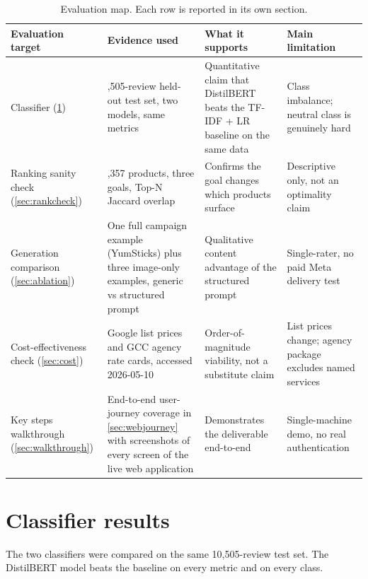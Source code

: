\documentclass[12pt,a4paper]{report}
\begin{document}
\begin{table}[ht!]
  \centering
  \caption{Evaluation map. Each row is reported in its own section.}
  \label{tab:evalmap}
  \small
  \begin{tabular}{@{}>{\raggedright\arraybackslash}p{1.35in}>{\raggedright\arraybackslash}p{1.65in}>{\raggedright\arraybackslash}p{1.55in}>{\raggedright\arraybackslash}p{1.55in}@{}}
    \toprule
    Evaluation target & Evidence used & What it supports & Main limitation \\
    \midrule
    Classifier (\cref{sec:classresults}) & 10,505-review held-out test set, two models, same metrics & Quantitative claim that DistilBERT beats the TF-IDF + LR baseline on the same data & Class imbalance; neutral class is genuinely hard \\
    \addlinespace
    Ranking sanity check (\cref{sec:rankcheck}) & 1,357 products, three goals, Top-N Jaccard overlap & Confirms the goal changes which products surface & Descriptive only, not an optimality claim \\
    \addlinespace
    Generation comparison (\cref{sec:ablation}) & One full campaign example (YumSticks) plus three image-only examples, generic vs structured prompt & Qualitative content advantage of the structured prompt & Single-rater, no paid Meta delivery test \\
    \addlinespace
    Cost-effectiveness check (\cref{sec:cost}) & Google list prices and GCC agency rate cards, accessed 2026-05-10 & Order-of-magnitude viability, not a substitute claim & List prices change; agency package excludes named services \\
    \addlinespace
    Key steps walkthrough (\cref{sec:walkthrough}) & End-to-end user-journey coverage in \cref{sec:webjourney} with screenshots of every screen of the live web application & Demonstrates the deliverable end-to-end & Single-machine demo, no real authentication \\
    \bottomrule
  \end{tabular}
\end{table}

\section{Classifier results}
\label{sec:classresults}

The two classifiers were compared on the same 10,505-review test set. The DistilBERT model beats the baseline on every metric and on every class.
\end{document}
